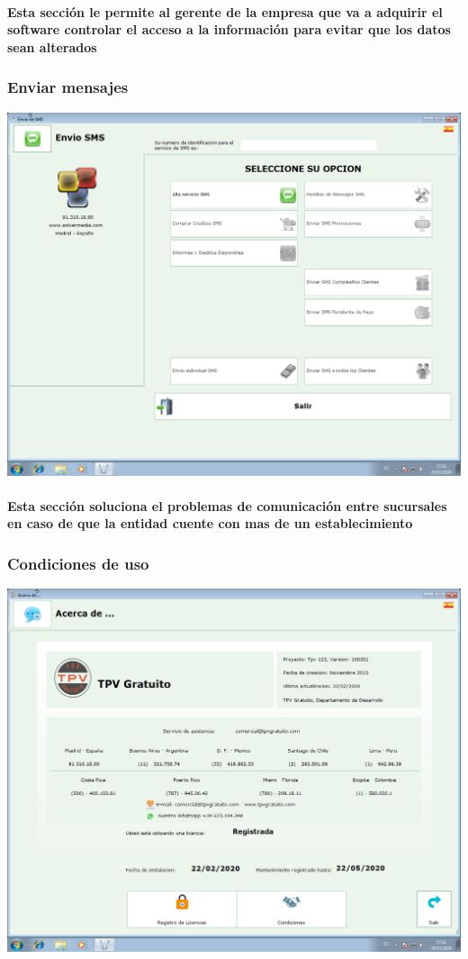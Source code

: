 \documentclass[12pt,a4paper]{ articule }
\begin{document}
\paragraph{Esta sección le permite al gerente de la empresa que va a adquirir el software controlar el acceso a la información para evitar que los datos sean alterados} 

\subsubsection*{Enviar mensajes}
\includegraphics[scale=0.35]{Envio SMS.png}
\paragraph{Esta sección soluciona el problemas de comunicación entre sucursales en caso de que la entidad cuente con mas de un establecimiento} 

\subsubsection*{Condiciones de uso }
\includegraphics[scale=0.35]{Acerca de.png} 
\end{document}
